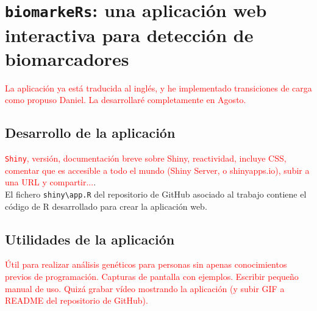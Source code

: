 \chapter{\texttt{biomarkeRs}: una aplicación web interactiva para detección de biomarcadores}

\textcolor{red}{La aplicación ya está traducida al inglés, y he implementado transiciones de carga como propuso Daniel. La desarrollaré completamente en Agosto.}\\

\section{Desarrollo de la aplicación}

\textcolor{red}{\texttt{Shiny}, versión, documentación breve sobre Shiny, reactividad, incluye CSS, comentar que es accesible a todo el mundo (Shiny Server, o shinyapps.io), subir a una URL y compartir...}.\\

El fichero \texttt{shiny\textbackslash app.R} del repositorio de GitHub asociado al trabajo \cite{Redondo-Sanchez2020}  contiene el código de R desarrollado para crear la aplicación web.

\section{Utilidades de la aplicación}

\textcolor{red}{Útil para realizar análisis genéticos para personas sin apenas conocimientos previos de programación. Capturas de pantalla con ejemplos. Escribir pequeño manual de uso. Quizá grabar vídeo mostrando la aplicación (y subir GIF a README del repositorio de GitHub).}